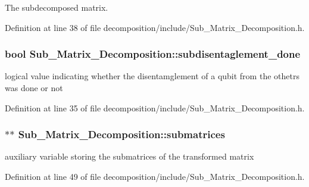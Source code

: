 The subdecomposed matrix. 



Definition at line 38 of file decomposition/include/\+Sub\+\_\+\+Matrix\+\_\+\+Decomposition.\+h.

\subsubsection[{\texorpdfstring{subdisentaglement\+\_\+done}{subdisentaglement_done}}]{\setlength{\rightskip}{0pt plus 5cm}bool Sub\+\_\+\+Matrix\+\_\+\+Decomposition\+::subdisentaglement\+\_\+done}\hypertarget{class_sub___matrix___decomposition_a569c72bfb90a0593b45f29606ef5c068}{}\label{class_sub___matrix___decomposition_a569c72bfb90a0593b45f29606ef5c068}


logical value indicating whether the disentamglement of a qubit from the othetrs was done or not 



Definition at line 35 of file decomposition/include/\+Sub\+\_\+\+Matrix\+\_\+\+Decomposition.\+h.

\subsubsection[{\texorpdfstring{submatrices}{submatrices}}]{ $\ast$$\ast$ Sub\+\_\+\+Matrix\+\_\+\+Decomposition\+::submatrices\hspace{0.3cm}{\ttfamily [protected]}}\hypertarget{class_sub___matrix___decomposition_ac0e3764e04bd296fb015cbba032aa4e4}{}\label{class_sub___matrix___decomposition_ac0e3764e04bd296fb015cbba032aa4e4}


auxiliary variable storing the submatrices of the transformed matrix 



Definition at line 49 of file decomposition/include/\+Sub\+\_\+\+Matrix\+\_\+\+Decomposition.\+h.

